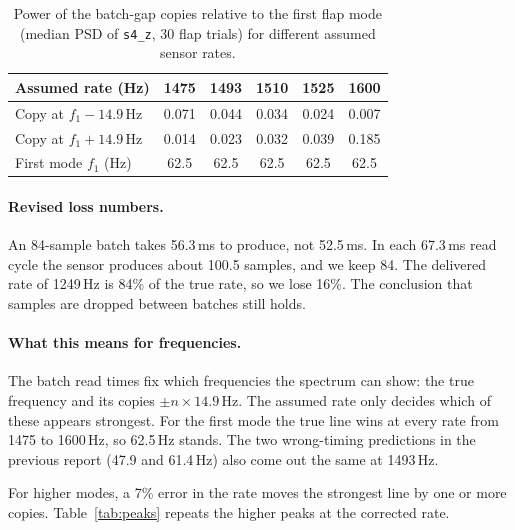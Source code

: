 \documentclass[11pt]{article}
\newcommand{\code}[1]{\texttt{#1}}
\begin{document}
\begin{table}[h]
  \centering
  \begin{tabular}{lccccc}
    \toprule
    Assumed rate (Hz) & 1475 & 1493 & 1510 & 1525 & 1600 \\
    \midrule
    Copy at $f_1 - 14.9$\,Hz & 0.071 & 0.044 & 0.034 & 0.024 & 0.007 \\
    Copy at $f_1 + 14.9$\,Hz & 0.014 & 0.023 & 0.032 & 0.039 & 0.185 \\
    First mode $f_1$ (Hz) & 62.5 & 62.5 & 62.5 & 62.5 & 62.5 \\
    \bottomrule
  \end{tabular}
  \caption{Power of the batch-gap copies relative to the first flap mode
  (median PSD of \code{s4\_z}, 30 flap trials) for different assumed
  sensor rates.}
  \label{tab:copies}
\end{table}

\paragraph{Revised loss numbers.} An 84-sample batch takes 56.3\,ms to
produce, not 52.5\,ms. In each 67.3\,ms read cycle the sensor produces
about 100.5 samples, and we keep 84. The delivered rate of 1249\,Hz is 84\%
of the true rate, so we lose 16\%. The conclusion that samples are dropped
between batches still holds.

\paragraph{What this means for frequencies.} The batch read times fix which
frequencies the spectrum can show: the true frequency and its copies
$\pm n \times 14.9$\,Hz. The assumed rate only decides which of these
appears strongest. For the first mode the true line wins at every rate from
1475 to 1600\,Hz, so 62.5\,Hz stands. The two wrong-timing predictions in the
previous report (47.9 and 61.4\,Hz) also come out the same at 1493\,Hz.

For higher modes, a 7\% error in the rate moves the strongest line by one or
more copies. Table~\ref{tab:peaks} repeats the higher peaks at the corrected
rate.
\end{document}
